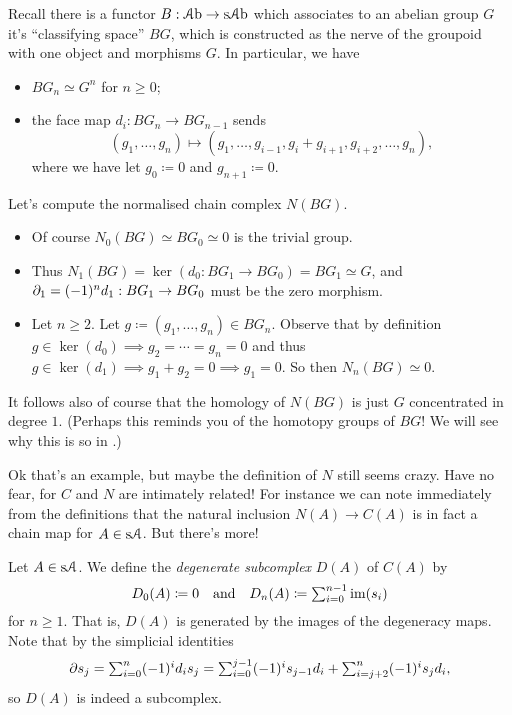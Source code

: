 \begin{example}
  Recall there is a functor $B : {\mathcal{A}\mathrm{b}} \to \mathrm{s}{\mathcal{A}\mathrm{b}}$ which associates to an
  abelian group $G$ it's ``classifying space'' $BG$, which is
  constructed as the nerve of the groupoid with one object and
  morphisms $G$. In particular, we have
  \begin{itemize}
  \item $BG_n \simeq G^n$ for $n \ge 0$;
  \item the face map $d_i : BG_n \to BG_{n-1}$ sends
    \[
    (g_1,\ldots,g_n) \mapsto (g_1,\ldots,g_{i-1}, g_i + g_{i+1},
    g_{i+2}, \ldots, g_n),
    \]
    where we have let $g_0 \coloneqq 0$ and $g_{n+1} \coloneqq 0$.
  \end{itemize}
  Let's compute the normalised chain complex $N(BG)$.
  \begin{itemize}
  \item Of course $N_0(BG) \simeq BG_0 \simeq 0$ is the trivial group.
  \item Thus $N_1(BG) = \ker(d_0 : BG_1 \to BG_0) = BG_1 \simeq G$,
    and $\partial_1 = (-1)^n d_1 : BG_1 \to BG_0$ must be the zero
    morphism.
  \item Let $n \ge 2$. Let $g \coloneqq (g_1, \ldots, g_n) \in
    BG_n$. Observe that by definition $g \in \ker(d_0) \implies g_2 =
    \cdots = g_n = 0$ and thus $g \in \ker(d_1) \implies g_1 + g_2 = 0
    \implies g_1 = 0$. So then $N_n(BG) \simeq 0$.
  \end{itemize}
  It follows also of course that the homology of $N(BG)$ is just $G$
  concentrated in degree $1$. (Perhaps this reminds you of the
  homotopy groups of $BG$! We will see why this is so in .)
\end{example}

Ok that's an example, but maybe the definition of $N$ still seems
crazy. Have no fear, for $C$ and $N$ are intimately related! For
instance we can note immediately from the definitions that the natural
inclusion $N(A) \to C(A)$ is in fact a chain map for $A \in \mathrm{s}\mathcal{A}$. But
there's more!

\begin{definition}
  Let $A \in \mathrm{s}\mathcal{A}$. We define the \textit{degenerate subcomplex}
  $D(A)$ of $C(A)$ by
  \[
  \textstyle{D_0(A) \coloneqq 0 \quad\text{and}\quad D_n(A) \coloneqq
    \sum_{i=0}^{n-1} \operatorname{im}(s_i)}
  \]
  for $n \ge 1$. That is, $D(A)$ is generated by the images of
  the degeneracy maps. Note that by the simplicial identities
  \[
  \textstyle{\partial s_j = \sum_{i=0}^n (-1)^i d_i s_j = \sum_{i=0}^{j-1}
    (-1)^i s_{j-1} d_i + \sum_{i=j+2}^n (-1)^i s_j d_i,}
  \]
  so $D(A)$ is indeed a subcomplex.
\end{definition}


